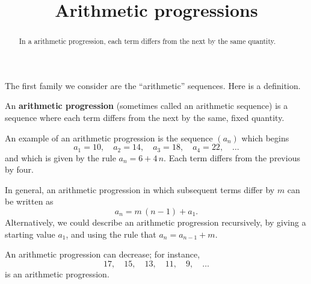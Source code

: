 \documentclass{ximera}
\title{Arithmetic progressions}
\newcommand{\defnword}[1]{\textbf{#1}}
\renewcommand{\index}[1]{}
\begin{document}
\begin{abstract}
  In a arithmetic progression, each term differs from the next by the same quantity.
\end{abstract}

\maketitle


The first family we consider are the ``arithmetic'' sequences.  Here
is a definition.



\begin{definition}
  An \defnword{arithmetic progression} (sometimes called an arithmetic
  sequence)\index{arithmetic progression} is a sequence where each
  term differs from the next by the same, fixed quantity.
\end{definition}

\begin{example}
  An example of an arithmetic progression is the sequence $(a_n)$ which begins 
  $$
  a_1 = 10, \quad a_2 = 14, \quad a_3 = 18, \quad a_4 = 22, \quad\ldots
  $$
  and which is given by the rule $a_n = 6 + 4 \, n$.  Each term differs
  from the previous by four.
\end{example}

In general, an arithmetic progression in which subsequent terms differ
by $m$ can be written as
$$
a_n = m \, (n-1) + a_1.
$$
Alternatively, we could describe an arithmetic progression
recursively, by giving a starting value $a_1$, and using the rule that
$a_{n} = a_{n-1} + m$.


An arithmetic progression can decrease; for instance,
$$
17,\quad  15,\quad  13,\quad  11,\quad  9, \quad\ldots
$$
is an arithmetic progression.
\end{document}
